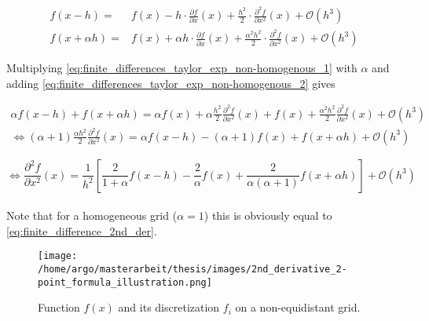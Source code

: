 \documentclass{scrartcl}[12pt, halfparskip]
\numberwithin{equation}{section}
\numberwithin{figure}{section}
\numberwithin{table}{section}
\begin{document}
\begin{subequations}
	\label{eq:finite_differences_taylor_exp_non-homogenous}
	\begin{align}
	f(x-h) = & f(x) - h \cdot \frac{\partial f}{\partial x}(x) + \frac{h^2}{2} \cdot \frac{\partial^2 f}{\partial x^2}(x) + \mathcal{O}(h^3) \label{eq:finite_differences_taylor_exp_non-homogenous_1} \\
	f(x+\alpha h) = & f(x) + \alpha h \cdot \frac{\partial f}{\partial x}(x) + \frac{\alpha^2 h^2}{2} \cdot \frac{\partial^2 f}{\partial x^2}(x) + \mathcal{O}(h^3)  \label{eq:finite_differences_taylor_exp_non-homogenous_2}
	\end{align}
\end{subequations}



Multiplying \cref{eq:finite_differences_taylor_exp_non-homogenous_1} with $\alpha$ and adding \cref{eq:finite_differences_taylor_exp_non-homogenous_2} gives

\begin{align}
\alpha f(x-h) + f(x+\alpha h) = \alpha f(x) + \alpha \frac{h^2}{2} \frac{\partial^2 f}{\partial x^2}(x) + f(x) + \frac{\alpha^2 h^2}{2} \frac{\partial^2 f}{\partial x^2}(x) + \mathcal{O}(h^3)  \\
\Leftrightarrow (\alpha+1) \frac{\alpha h^2}{2} \frac{\partial^2 f}{\partial x^2}(x) = \alpha f(x-h) - (\alpha+1) f(x) + f(x+\alpha h) + \mathcal{O}(h^3) 
\end{align}

\begin{equation}
\Leftrightarrow \frac{\partial^2 f}{\partial x^2}(x) = \frac{1}{h^2} \left[ \frac{2}{1+\alpha} f(x-h) - \frac{2}{\alpha} f(x) + \frac{2}{\alpha (\alpha+1)} f(x+\alpha h) \right] + \mathcal{O}(h^3) 
\label{eq:2_point_formula_inhomogeneous}
\end{equation} \\

Note that for a homogeneous grid ($\alpha=1$) this is obviously equal to \cref{eq:finite_difference_2nd_der}. \\

\begin{figure}[H]
	\centering
	\texttt{[image: /home/argo/masterarbeit/thesis/images/2nd\_derivative\_2-point\_formula\_illustration.png]}
	\caption{Function $f(x)$ and its discretization $f_i$ on a non-equidistant grid.}
	\label{fig:2_point_formula_illustration}
\end{figure}
\end{document}
